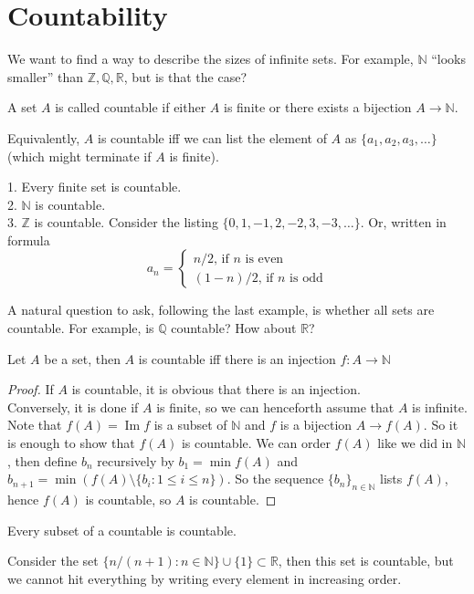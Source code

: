 \section{Countability}
We want to find a way to describe the sizes of infinite sets.
For example, $\mathbb N$ ``looks smaller'' than $\mathbb Z,\mathbb Q, \mathbb R$, but is that the case?
\begin{definition}
    A set $A$ is called countable if either $A$ is finite or there exists a bijection $A\to\mathbb N$.
\end{definition}
Equivalently, $A$ is countable iff we can list the element of $A$ as $\{a_1,a_2,a_3,\ldots\}$ (which might terminate if $A$ is finite).
\begin{example}
    1. Every finite set is countable.\\
    2. $\mathbb N$ is countable.\\
    3. $\mathbb Z$ is countable.
    Consider the listing $\{0,1,-1,2,-2,3,-3,\ldots\}$.
    Or, written in formula
    $$a_n=
    \begin{cases}
        n/2\text{, if $n$ is even}\\
        (1-n)/2\text{, if $n$ is odd}
    \end{cases}$$
\end{example}
A natural question to ask, following the last example, is whether all sets are countable.
For example, is $\mathbb Q$ countable?
How about $\mathbb R$?
\begin{proposition}
    Let $A$ be a set, then $A$ is countable iff there is an injection $f:A\to\mathbb N$
\end{proposition}
\begin{proof}
    If $A$ is countable, it is obvious that there is an injection.\\
    Conversely, it is done if $A$ is finite, so we can henceforth assume that $A$ is infinite.
    Note that $f(A)=\operatorname{Im}f$ is a subset of $\mathbb N$ and $f$ is a bijection $A\to f(A)$.
    So it is enough to show that $f(A)$ is countable.
    We can order $f(A)$ like we did in $\mathbb N$, then define $b_n$ recursively by $b_1=\min f(A)$ and $b_{n+1}=\min (f(A)\setminus\{b_i:1\le i\le n\})$.
    So the sequence $\{b_n\}_{n\in\mathbb N}$ lists $f(A)$, hence $f(A)$ is countable, so $A$ is countable.
\end{proof}
\begin{corollary}
    Every subset of a countable is countable.
\end{corollary}
\begin{remark}
    Consider the set $\{n/(n+1):n\in\mathbb N\}\cup\{1\}\subset \mathbb R$, then this set is countable, but we cannot hit everything by writing every element in increasing order.
\end{remark}
